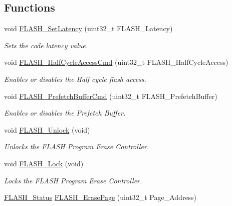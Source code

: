 \subsection*{Functions}
\begin{DoxyCompactItemize}
\item 
void \hyperlink{group___f_l_a_s_h___exported___functions_ga54bcb96270215c752c3479c8c9e438c0}{F\+L\+A\+S\+H\+\_\+\+Set\+Latency} (uint32\+\_\+t F\+L\+A\+S\+H\+\_\+\+Latency)
\begin{DoxyCompactList}\small\item\em Sets the code latency value. \end{DoxyCompactList}\item 
void \hyperlink{group___f_l_a_s_h___exported___functions_ga978103a57b37920ac01128e999f9ece6}{F\+L\+A\+S\+H\+\_\+\+Half\+Cycle\+Access\+Cmd} (uint32\+\_\+t F\+L\+A\+S\+H\+\_\+\+Half\+Cycle\+Access)
\begin{DoxyCompactList}\small\item\em Enables or disables the Half cycle flash access. \end{DoxyCompactList}\item 
void \hyperlink{group___f_l_a_s_h___exported___functions_ga6b93faaf0f560bf8d662b2cefe2f70e8}{F\+L\+A\+S\+H\+\_\+\+Prefetch\+Buffer\+Cmd} (uint32\+\_\+t F\+L\+A\+S\+H\+\_\+\+Prefetch\+Buffer)
\begin{DoxyCompactList}\small\item\em Enables or disables the Prefetch Buffer. \end{DoxyCompactList}\item 
void \hyperlink{group___f_l_a_s_h___exported___functions_ga4084d0184bab463a1579271bf474aaef}{F\+L\+A\+S\+H\+\_\+\+Unlock} (void)
\begin{DoxyCompactList}\small\item\em Unlocks the F\+L\+A\+SH Program Erase Controller. \end{DoxyCompactList}\item 
void \hyperlink{group___f_l_a_s_h___exported___functions_ga46899557353c4312ddbe3f25e65df1d8}{F\+L\+A\+S\+H\+\_\+\+Lock} (void)
\begin{DoxyCompactList}\small\item\em Locks the F\+L\+A\+SH Program Erase Controller. \end{DoxyCompactList}\item 
\hyperlink{group___f_l_a_s_h___exported___types_gadc63a6f3404ff1f71229a66915e9cdc0}{F\+L\+A\+S\+H\+\_\+\+Status} \hyperlink{group___f_l_a_s_h___exported___functions_ga13a2ca18bfb3d5fb827a2751799f8451}{F\+L\+A\+S\+H\+\_\+\+Erase\+Page} (uint32\+\_\+t Page\+\_\+\+Address)

\end{DoxyCompactItemize}
